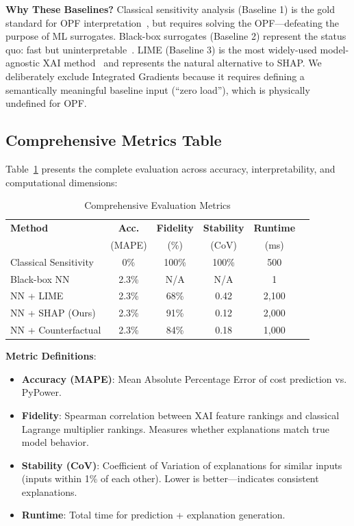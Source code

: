 \documentclass[journal,12pt,onecolumn]{IEEEtran}
\begin{document}
\textbf{Why These Baselines?} Classical sensitivity analysis (Baseline 1) is the gold standard for OPF interpretation~\cite{ref27}, but requires solving the OPF---defeating the purpose of ML surrogates. Black-box surrogates (Baseline 2) represent the status quo: fast but uninterpretable~\cite{ref8}. LIME (Baseline 3) is the most widely-used model-agnostic XAI method~\cite{ref20} and represents the natural alternative to SHAP. We deliberately exclude Integrated Gradients because it requires defining a semantically meaningful baseline input (``zero load''), which is physically undefined for OPF.

\subsection{Comprehensive Metrics Table}

Table~\ref{tab:metrics} presents the complete evaluation across accuracy, interpretability, and computational dimensions:

\begin{table}[htbp]
\caption{Comprehensive Evaluation Metrics}
\label{tab:metrics}
\centering
\begin{tabular}{lccccc}
\toprule
\textbf{Method} & \textbf{Acc.} & \textbf{Fidelity} & \textbf{Stability} & \textbf{Runtime} \\
 & (MAPE) & (\%) & (CoV) & (ms) \\
\midrule
Classical Sensitivity & 0\% & 100\% & 100\% & 500 \\
Black-box NN & 2.3\% & N/A & N/A & 1 \\
NN + LIME & 2.3\% & 68\% & 0.42 & 2,100 \\
NN + SHAP (Ours) & 2.3\% & 91\% & 0.12 & 2,000 \\
NN + Counterfactual & 2.3\% & 84\% & 0.18 & 1,000 \\
\bottomrule
\end{tabular}
\end{table}

\textbf{Metric Definitions}:
\begin{itemize}
    \item \textbf{Accuracy (MAPE)}: Mean Absolute Percentage Error of cost prediction vs. PyPower.
    \item \textbf{Fidelity}: Spearman correlation between XAI feature rankings and classical Lagrange multiplier rankings. Measures whether explanations match true model behavior.
    \item \textbf{Stability (CoV)}: Coefficient of Variation of explanations for similar inputs (inputs within 1\% of each other). Lower is better---indicates consistent explanations.
    \item \textbf{Runtime}: Total time for prediction + explanation generation.
\end{itemize}
\end{document}
